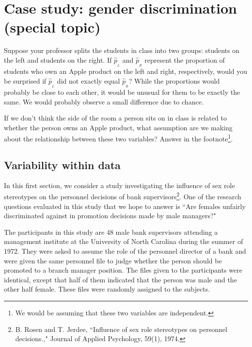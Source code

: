 
\section{Case study: gender discrimination (special topic)}
\label{caseStudyGenderDiscrimination}


\begin{example}{Suppose your professor splits the students in class into two groups: students on the left and students on the right. If $\hat{p}_{_L}$ and $\hat{p}_{_R}$ represent the proportion of students who own an Apple product on the left and right, respectively, would you be surprised if $\hat{p}_{_L}$ did not {exactly} equal $\hat{p}_{_R}$?}\label{classRightLeftSideApple}
While the proportions would probably be close to each other, it would be unusual for them to be exactly the same. We would probably observe a small difference due to {chance}.
\end{example}

\begin{exercise}
If we don't think the side of the room a person sits on in class is related to whether the person owns an Apple product, what assumption are we making about the relationship between these two variables?
Answer in the footnote\footnote{We would be assuming that these two variables are independent.}.
\end{exercise}


\subsection{Variability within data}
\label{variabilityWithinData}


In this first section, we consider a study investigating the influence of sex role stereotypes on the personnel decisions of bank supervisors\footnote{B. Rosen and T. Jerdee, ``Influence of sex role stereotypes on personnel decisions.," Journal of Applied Psychology, 59(1), 1974.}. \citep{Rosen:1974} One of the research questions evaluated in this study that we hope to answer is ``Are females unfairly discriminated against in promotion decisions made by male managers?"

The participants in this study are 48 male bank supervisors attending a management institute at the University of North Carolina during the summer of 1972. They were asked to assume the role of the personnel director of a bank and were given the same personnel file to judge whether the person should be promoted to a branch manager position. The files given to the participants were identical, except that half of them indicated that the person was male and the other half female. These files were randomly assigned to the subjects.

